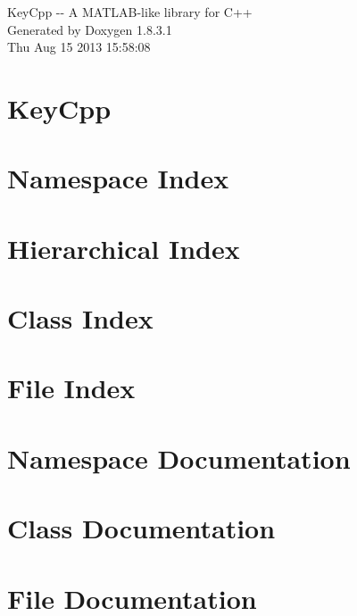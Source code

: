 \documentclass{book}
\begin{document}
\hypersetup{pageanchor=false,citecolor=blue}
\begin{titlepage}
\vspace*{7cm}
\begin{center}
{\Large Key\-Cpp -\/-\/ A M\-A\-T\-L\-A\-B-\/like library for C++ }\\
\vspace*{1cm}
{\large Generated by Doxygen 1.8.3.1}\\
\vspace*{0.5cm}
{\small Thu Aug 15 2013 15:58:08}\\
\end{center}
\end{titlepage}
\clearemptydoublepage
{}
\tableofcontents
\clearemptydoublepage
{}
\hypersetup{pageanchor=true,citecolor=blue}
\chapter{Key\-Cpp}
\label{index}\hypertarget{index}{}
\chapter{Namespace Index}

\chapter{Hierarchical Index}

\chapter{Class Index}

\chapter{File Index}

\chapter{Namespace Documentation}

\chapter{Class Documentation}




















\chapter{File Documentation}

\printindex
\end{document}
